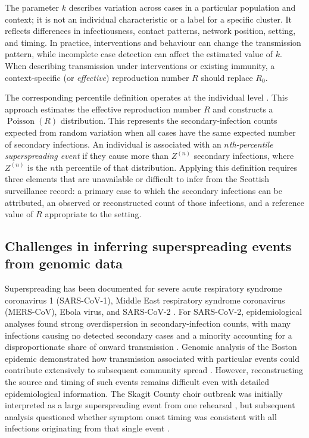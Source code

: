 The parameter $k$ describes variation across cases in a particular population and context; it is not an individual characteristic or a label for a specific cluster. It reflects differences in infectiousness, contact patterns, network position, setting, and timing. In practice, interventions and behaviour can change the transmission pattern, while incomplete case detection can affect the estimated value of $k$. When describing transmission under interventions or existing immunity, a context-specific (or \emph{effective}) reproduction number $R$ should replace $R_0$.

The corresponding percentile definition operates at the individual level \citep{LloydSmith2005}. This approach estimates the effective reproduction number $R$ and constructs a $\operatorname{Poisson}(R)$ distribution. This represents the secondary-infection counts expected from random variation when all cases have the same expected number of secondary infections. An individual is associated with an \emph{$n$th-percentile superspreading event} if they cause more than $Z^{(n)}$ secondary infections, where $Z^{(n)}$ is the $n$th percentile of that distribution. Applying this definition requires three elements that are unavailable or difficult to infer from the Scottish surveillance record: a primary case to which the secondary infections can be attributed, an observed or reconstructed count of those infections, and a reference value of $R$ appropriate to the setting.

\subsection{Challenges in inferring superspreading events from genomic data}\label{sec:ch2_identifying_sses}

Superspreading has been documented for severe acute respiratory syndrome coronavirus 1 (SARS-CoV-1), Middle East respiratory syndrome coronavirus (MERS-CoV), Ebola virus, and SARS-CoV-2 \citep{Shen2004,Cho2016,Lau2017,Endo2020,McKee2024,Stein2011}. For SARS-CoV-2, epidemiological analyses found strong overdispersion in secondary-infection counts, with many infections causing no detected secondary cases and a minority accounting for a disproportionate share of onward transmission \citep{Endo2020,Adam2020,McKee2024}. Genomic analysis of the Boston epidemic demonstrated how transmission associated with particular events could contribute extensively to subsequent community spread \citep{Lemieux2021}. However, reconstructing the source and timing of such events remains difficult even with detailed epidemiological information. The Skagit County choir outbreak was initially interpreted as a large superspreading event from one rehearsal \citep{Hamner2020,Miller2020}, but subsequent analysis questioned whether symptom onset timing was consistent with all infections originating from that single event \citep{Axon2023}.

